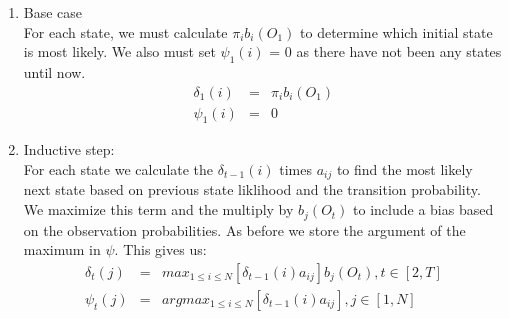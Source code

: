     \begin{enumerate}
        \item Base case \\
        For each state, we must calculate $\pi_i b_i(O_1)$ to determine which initial state is most likely. We also must set $\psi_1(i)$ = 0 as there have not been any states until now. 
        \begin{eqnarray}
            \delta_1(i) & = & \pi_i b_i(O_1) \\
            \psi_1(i)   & = & 0
        \end{eqnarray}

        \item Inductive step: \\
        For each state we calculate the $\delta_{t-1}(i)$ times $a_{ij}$ to find the most likely next state based on previous state liklihood and the transition probability. We maximize this term  and the multiply by  $b_j(O_t)$ to include a bias based on the observation probabilities. As before we store the argument of the maximum in $\psi$. This gives us:
        \begin{eqnarray}
            \delta_t(j) & = & max_{1 \leq i \leq N}[\delta_{t-1}(i) a_{ij}] b_j(O_t),  t \in [2,T] \\
            \psi_t(j)   & = & argmax_{1 \leq i \leq N}[\delta_{t-1}(i) a_{ij}], j \in [1,N]
        \end{eqnarray}
        
        \begin{figure}
            \begin{center}
\end{center}
\end{figure}
\end{enumerate}
